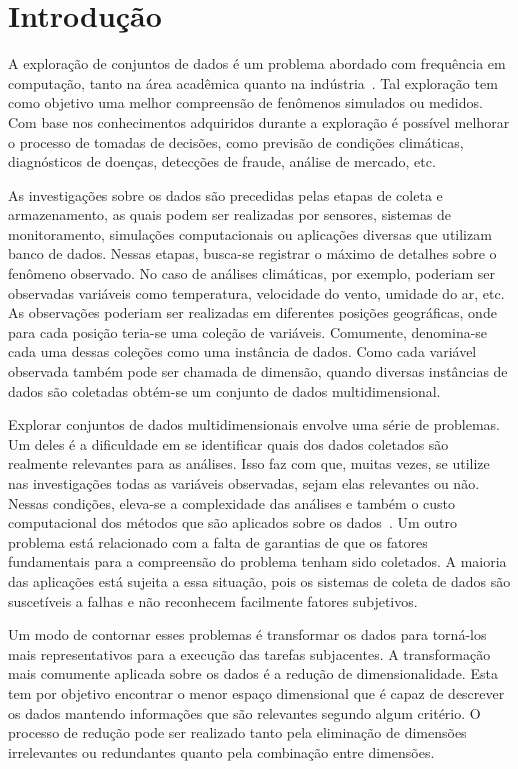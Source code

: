 \section{Introdução}

A exploração de conjuntos de dados é um problema abordado
com frequência em computação, tanto na área acadêmica quanto
na indústria~\cite{Ngai2009,Harding2006}. Tal exploração tem
como objetivo uma melhor compreensão de fenômenos simulados
ou medidos. Com base nos conhecimentos adquiridos durante a
exploração é possível melhorar o processo de tomadas de
decisões, como previsão de condições climáticas,
diagnósticos de doenças, detecções de fraude, análise de
mercado, etc.

As investigações sobre os dados são precedidas pelas etapas
de coleta e armazenamento, as quais podem ser realizadas por
sensores, sistemas de monitoramento, simulações
computacionais ou aplicações diversas que utilizam banco de
dados. Nessas etapas, busca-se registrar o máximo de
detalhes sobre o fenômeno observado. No caso de análises
climáticas, por exemplo, poderiam ser observadas variáveis
como temperatura, velocidade do vento, umidade do ar, etc.
As observações poderiam ser realizadas em diferentes
posições geográficas, onde para cada posição teria-se uma
coleção de variáveis. Comumente, denomina-se cada uma dessas
coleções como uma instância de dados.  Como cada variável
observada também pode ser chamada de dimensão, quando
diversas instâncias de dados são coletadas obtém-se um
conjunto de dados multidimensional. 

Explorar conjuntos de dados multidimensionais envolve uma
série de problemas. Um deles é a dificuldade em se
identificar quais dos dados coletados são realmente
relevantes para as análises. Isso faz com que, muitas vezes,
se utilize nas investigações todas as variáveis observadas,
sejam elas relevantes ou não. Nessas condições, eleva-se a
complexidade das análises e também o custo computacional dos
métodos que são aplicados sobre os dados~\cite{Beyer1999}.
Um outro problema está relacionado com a falta de garantias
de que os fatores fundamentais para a compreensão do
problema tenham sido coletados. A maioria das aplicações
está sujeita a essa situação, pois os sistemas de coleta de
dados são suscetíveis a falhas e não reconhecem facilmente
fatores subjetivos. 

Um modo de contornar esses problemas é transformar os dados
para torná-los mais representativos para a execução das
tarefas subjacentes. A transformação mais comumente aplicada
sobre os dados é a redução de dimensionalidade. Esta tem
por objetivo encontrar o menor espaço dimensional que é
capaz de descrever os dados mantendo informações que são
relevantes segundo algum critério. O processo de redução
pode ser realizado tanto pela eliminação de dimensões
irrelevantes ou redundantes quanto pela combinação entre
dimensões. 

